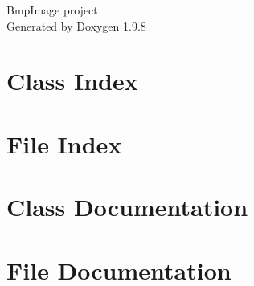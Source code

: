 \documentclass[twoside]{book}
\newcommand{\+}{\discretionary{\mbox{\scriptsize$\hookleftarrow$}}{}{}}
\newcommand{\clearemptydoublepage}{%
    \newpage{\pagestyle{empty}\cleardoublepage}%
  }
\begin{document}
  \raggedbottom
    \hypersetup{pageanchor=false,
                bookmarksnumbered=true,
                pdfencoding=unicode
               }
  \begin{titlepage}
  \vspace*{7cm}
  \begin{center}%
  {\Large Bmp\+Image project}\\
  \vspace*{1cm}
  {\large Generated by Doxygen 1.9.8}\\
  \end{center}
  \end{titlepage}
  \clearemptydoublepage
  \tableofcontents
  \clearemptydoublepage
  \hypersetup{pageanchor=true}
\chapter{Class Index}

\chapter{File Index}

\chapter{Class Documentation}







\chapter{File Documentation}
















  \backmatter
  \newpage
  \clearemptydoublepage
  \printindex
\end{document}
